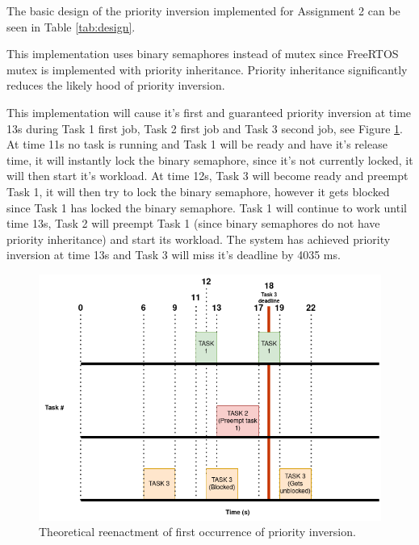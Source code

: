 The basic design of the priority inversion implemented for Assignment 2 can be seen in Table \ref{tab:design}.

This implementation uses binary semaphores instead of mutex since FreeRTOS mutex is implemented with priority inheritance. Priority inheritance significantly reduces the likely hood of priority inversion.

\begin{table}[ht]
    \centering
    \caption{Basic design of priority inversion for Assignment 2. Note that workload time is a rough estimate in the situation when no preemption occurs.}
    \label{tab:design}
\end{table}

This implementation will cause it's first and guaranteed priority inversion at time 13s during Task 1 first job, Task 2 first job and Task 3 second job, see Figure \ref{fig:scheduler}. At time 11s no task is running and Task 1 will be ready and have it's release time, it will instantly lock the binary semaphore, since it's not currently locked, it will then start it's workload. At time 12s, Task 3 will become ready and preempt Task 1, it will then try to lock the binary semaphore, however it gets blocked since Task 1 has locked the binary semaphore. Task 1 will continue to work until time 13s, Task 2 will preempt Task 1 (since binary semaphores do not have priority inheritance) and start its workload. The system has achieved priority inversion at time 13s and Task 3 will miss it's deadline by 4035 ms.

\begin{figure}[h]
    \centering
    \includegraphics[width=\columnwidth]{images/scheduler.png}
    \caption{Theoretical reenactment of first occurrence of priority inversion.}
    \label{fig:scheduler}
\end{figure}